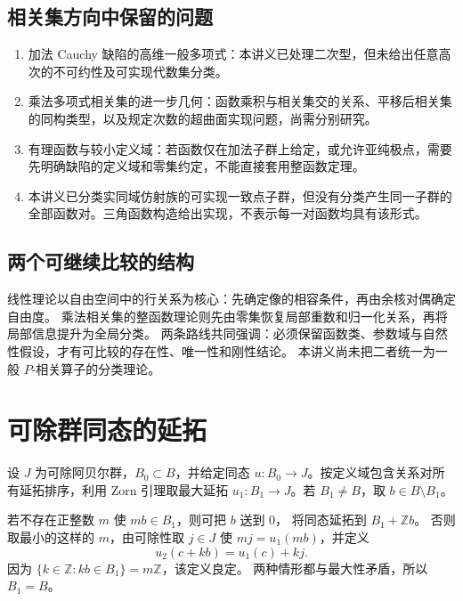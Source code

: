 \documentclass[11pt,a4paper,oneside,openany]{book}
\theoremstyle{lecture}
\newcommand{\Z}{\mathbb Z}
\numberwithin{equation}{section}
\begin{document}
\section{相关集方向中保留的问题}
\begin{enumerate}
\item 加法 Cauchy 缺陷的高维一般多项式：本讲义已处理二次型，但未给出任意高次的不可约性及可实现代数集分类。
\item 乘法多项式相关集的进一步几何：函数乘积与相关集交的关系、平移后相关集的同构类型，以及规定次数的超曲面实现问题，尚需分别研究。
\item 有理函数与较小定义域：若函数仅在加法子群上给定，或允许亚纯极点，需要先明确缺陷的定义域和零集约定，不能直接套用整函数定理。
\item 本讲义已分类实同域仿射族的可实现一致点子群，但没有分类产生同一子群的全部函数对。三角函数构造给出实现，不表示每一对函数均具有该形式。
\end{enumerate}

\section{两个可继续比较的结构}
线性理论以自由空间中的行关系为核心：先确定像的相容条件，再由余核对偶确定自由度。
乘法相关集的整函数理论则先由零集恢复局部重数和归一化关系，再将局部信息提升为全局分类。
两条路线共同强调：必须保留函数类、参数域与自然性假设，才有可比较的存在性、唯一性和刚性结论。
本讲义尚未把二者统一为一般 $P$-相关算子的分类理论。

\appendix
{}
\chapter{可除群同态的延拓}\label{app:divisible}



设 $J$ 为可除阿贝尔群，$B_0\subset B$，并给定同态
$u:B_0\to J$。按定义域包含关系对所有延拓排序，利用 Zorn 引理取最大延拓
$u_1:B_1\to J$。若 $B_1\ne B$，取 $b\in B\setminus B_1$。

若不存在正整数 $m$ 使 $mb\in B_1$，则可把 $b$ 送到 $0$，
将同态延拓到 $B_1+\Z b$。
否则取最小的这样的 $m$，由可除性取 $j\in J$ 使
$mj=u_1(mb)$，并定义
\[
 u_2(c+kb)=u_1(c)+kj.
\]
因为 $\{k\in\Z:kb\in B_1\}=m\Z$，该定义良定。
两种情形都与最大性矛盾，所以 $B_1=B$。
\end{document}
